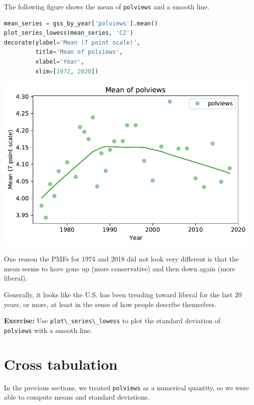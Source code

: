 The following figure shows the mean of
\passthrough{\lstinline!polviews!} and a smooth line.

\begin{lstlisting}[language=Python,style=source]
mean_series = gss_by_year['polviews'].mean()
plot_series_lowess(mean_series, 'C2')
decorate(ylabel='Mean (7 point scale)',
         title='Mean of polviews',
         xlabel='Year',
         xlim=[1972, 2020])
\end{lstlisting}

\begin{center}
\includegraphics[scale=0.75]{02_polviews_files/02_polviews_53_0.pdf}
\end{center}

One reason the PMFs for 1974 and 2018 did not look very different is
that the mean seems to have gone up (more conservative) and then down
again (more liberal).

Generally, it looks like the U.S. has been trending toward liberal for
the last 20 years, or more, at least in the sense of how people describe
themselves.

\textbf{Exercise:} Use \passthrough{\lstinline!plot\_series\_lowess!} to
plot the standard deviation of \passthrough{\lstinline!polviews!} with a
smooth line.

\hypertarget{cross-tabulation}{%
\section{Cross tabulation}\label{cross-tabulation}}

In the previous sections, we treated \passthrough{\lstinline!polviews!}
as a numerical quantity, so we were able to compute means and standard
deviations.

